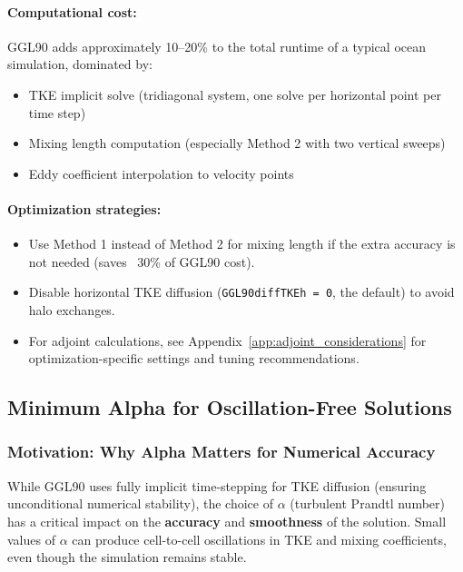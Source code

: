 \documentclass[12pt,letterpaper]{article}
\begin{document}
\paragraph{Computational cost:} GGL90 adds approximately 10--20\% to the total runtime of a typical ocean simulation, dominated by:
\begin{itemize}
\item TKE implicit solve (tridiagonal system, one solve per horizontal point per time step)
\item Mixing length computation (especially Method 2 with two vertical sweeps)
\item Eddy coefficient interpolation to velocity points
\end{itemize}

\paragraph{Optimization strategies:}
\begin{itemize}
\item Use Method 1 instead of Method 2 for mixing length if the extra accuracy is not needed (saves ~30\% of GGL90 cost).
\item Disable horizontal TKE diffusion (\verb|GGL90diffTKEh = 0|, the default) to avoid halo exchanges.
\item For adjoint calculations, see Appendix~\ref{app:adjoint_considerations} for optimization-specific settings and tuning recommendations.
\end{itemize}

\subsection{Minimum Alpha for Oscillation-Free Solutions}
\label{sec:alpha_min_analysis}

\subsubsection{Motivation: Why Alpha Matters for Numerical Accuracy}

While GGL90 uses fully implicit time-stepping for TKE diffusion (ensuring unconditional numerical stability), the choice of $\alpha$ (turbulent Prandtl number) has a critical impact on the \textbf{accuracy} and \textbf{smoothness} of the solution. Small values of $\alpha$ can produce cell-to-cell oscillations in TKE and mixing coefficients, even though the simulation remains stable.
\end{document}
